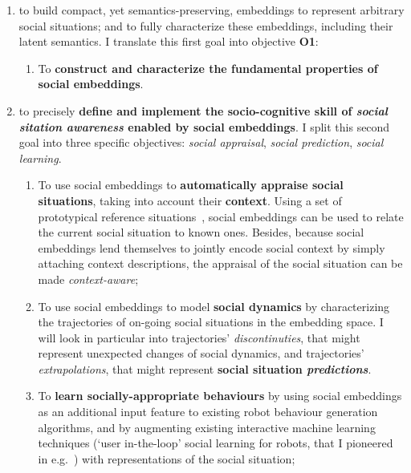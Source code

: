 \begin{enumerate}[label=\textbf{(\arabic*)}]
    \item to build compact, yet semantics-preserving, embeddings to represent
arbitrary social situations; and to fully characterize these embeddings,
including their latent semantics. I translate this first goal into objective
{\bf O1}:

\begin{enumerate}[label=\textbf{O\arabic*}]
    \item \label{O1} To \textbf{construct and characterize the fundamental
properties of social embeddings}.
\end{enumerate}

    \item to precisely \textbf{define and implement the socio-cognitive skill of
        \emph{social sitation awareness} enabled by social embeddings}. I split this
        second goal into three specific objectives: \emph{social appraisal},
        \emph{social prediction}, \emph{social learning}.

\begin{enumerate}[label=\textbf{O2.\arabic*}]
    \item \label{O2.1} To use social embeddings to \textbf{automatically appraise
        social situations}, taking into account their \textbf{context}. Using
        a set of prototypical reference situations~\cite{kelley2003atlas}, social embeddings
        can be used to relate the current social situation to known ones.
        Besides, because social embeddings lend themselves to jointly encode
        social context by simply attaching context descriptions, the appraisal
        of the social situation can be made \emph{context-aware};

    \item \label{O2.2} To use social embeddings to model \textbf{social
        dynamics} by characterizing the trajectories of on-going social situations in the
        embedding space. I will look in particular into trajectories'
        \emph{discontinuties}, that might represent unexpected changes of social
        dynamics, and trajectories' \emph{extrapolations}, that might represent
        \textbf{social situation \emph{predictions}}.

    \item \label{O2.3} To \textbf{learn socially-appropriate behaviours} by using
        social embeddings as an additional input feature to existing robot behaviour
        generation algorithms, and by augmenting existing interactive machine
        learning techniques (`user in-the-loop' social learning for robots, that I
        pioneered in e.g.~\cite{winkle2021leador}) with
        representations of the social situation;

\end{enumerate}
\end{enumerate}

